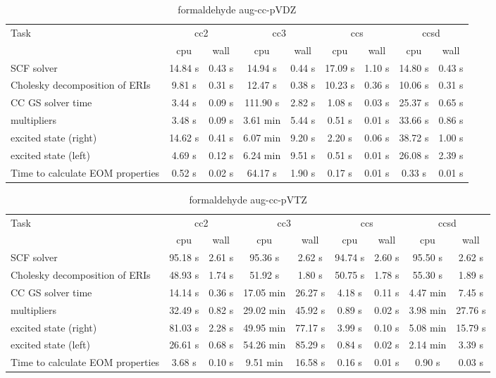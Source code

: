 \documentclass{article}
\begin{document}
\begin{table}
\caption{formaldehyde aug-cc-pVDZ}
\begin{tabular}{lcccccccc}
\toprule
Task & \multicolumn{2}{c}{cc2} & \multicolumn{2}{c}{cc3} & \multicolumn{2}{c}{ccs} & \multicolumn{2}{c}{ccsd}\\
\cmidrule(lr){2-3}\cmidrule(lr){4-5}\cmidrule(lr){6-7}\cmidrule(lr){8-9}
 & cpu & wall & cpu & wall & cpu & wall & cpu & wall\\
\midrule
SCF solver & 14.84 s & 0.43 s & 14.94 s & 0.44 s & 17.09 s & 1.10 s & 14.80 s & 0.43 s\\
Cholesky decomposition of ERIs & 9.81 s & 0.31 s & 12.47 s & 0.38 s & 10.23 s & 0.36 s & 10.06 s & 0.31 s\\
CC GS solver time & 3.44 s & 0.09 s & 111.90 s & 2.82 s & 1.08 s & 0.03 s & 25.37 s & 0.65 s\\
multipliers & 3.48 s & 0.09 s & 3.61 min & 5.44 s & 0.51 s & 0.01 s & 33.66 s & 0.86 s\\
excited state (right) & 14.62 s & 0.41 s & 6.07 min & 9.20 s & 2.20 s & 0.06 s & 38.72 s & 1.00 s\\
excited state (left) & 4.69 s & 0.12 s & 6.24 min & 9.51 s & 0.51 s & 0.01 s & 26.08 s & 2.39 s\\
Time to calculate EOM properties & 0.52 s & 0.02 s & 64.17 s & 1.90 s & 0.17 s & 0.01 s & 0.33 s & 0.01 s\\
\bottomrule
\end{tabular}
\end{table}
\begin{table}
\caption{formaldehyde aug-cc-pVTZ}
\begin{tabular}{lcccccccc}
\toprule
Task & \multicolumn{2}{c}{cc2} & \multicolumn{2}{c}{cc3} & \multicolumn{2}{c}{ccs} & \multicolumn{2}{c}{ccsd}\\
\cmidrule(lr){2-3}\cmidrule(lr){4-5}\cmidrule(lr){6-7}\cmidrule(lr){8-9}
 & cpu & wall & cpu & wall & cpu & wall & cpu & wall\\
\midrule
SCF solver & 95.18 s & 2.61 s & 95.36 s & 2.62 s & 94.74 s & 2.60 s & 95.50 s & 2.62 s\\
Cholesky decomposition of ERIs & 48.93 s & 1.74 s & 51.92 s & 1.80 s & 50.75 s & 1.78 s & 55.30 s & 1.89 s\\
CC GS solver time & 14.14 s & 0.36 s & 17.05 min & 26.27 s & 4.18 s & 0.11 s & 4.47 min & 7.45 s\\
multipliers & 32.49 s & 0.82 s & 29.02 min & 45.92 s & 0.89 s & 0.02 s & 3.98 min & 27.76 s\\
excited state (right) & 81.03 s & 2.28 s & 49.95 min & 77.17 s & 3.99 s & 0.10 s & 5.08 min & 15.79 s\\
excited state (left) & 26.61 s & 0.68 s & 54.26 min & 85.29 s & 0.84 s & 0.02 s & 2.14 min & 3.39 s\\
Time to calculate EOM properties & 3.68 s & 0.10 s & 9.51 min & 16.58 s & 0.16 s & 0.01 s & 0.90 s & 0.03 s\\
\bottomrule
\end{tabular}
\end{table}
\end{document}
